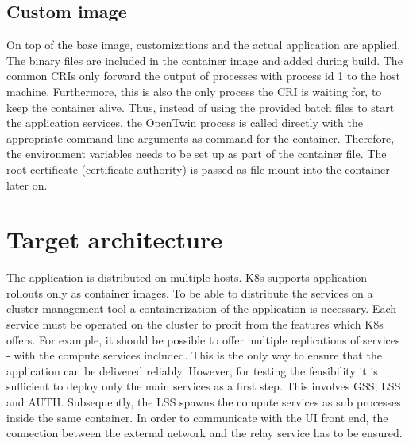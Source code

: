 
\subsection{Custom image}
On top of the base image, customizations and the actual application are applied. The binary files are included in the container image and added during build. The common \acp{CRI} only forward the output of processes with process id 1 to the host machine. Furthermore, this is also the only process the  \ac{CRI} is waiting for, to keep the container alive. Thus, instead of using the provided batch files to start the application services, the OpenTwin process is called directly with the appropriate command line arguments as command for the container.
Therefore, the environment variables needs to be set up as part of the container file.
The root certificate (certificate authority) is passed as file mount into the container later on.

\vspace{2em}
\section{Target architecture}
The application is distributed on multiple hosts. \ac{K8s} supports application rollouts only as container images. To be able to distribute the services on a cluster management tool a containerization of the application is necessary.
Each service must be operated on the cluster to profit from the features which \ac{K8s} offers. For example, it should be possible to offer multiple replications of services - with the compute services included. This is the only way to ensure that the application can be delivered reliably. 
However, for testing the feasibility it is sufficient to deploy only the main services as a first step. This involves \ac{GSS}, \ac{LSS} and \ac{AUTH}. Subsequently, the \ac{LSS} spawns the compute services as sub processes inside the same container. In order to communicate with the \ac{UI} front end, the connection between the external network and the relay service has to be ensured.

